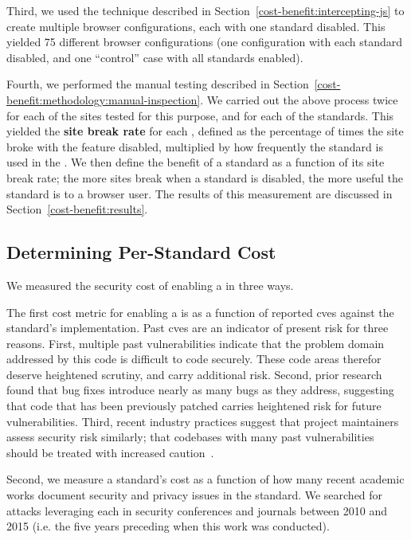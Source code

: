 Third, we used the technique described in
Section~\ref{cost-benefit:intercepting-js} to create multiple browser
configurations, each with one standard disabled.  This yielded 75 different
browser configurations (one configuration with each standard disabled, and one
``control'' case with all standards enabled).

Fourth, we performed the manual testing described in
Section~\ref{cost-benefit:methodology:manual-inspection}.  We carried out the
above process twice for each of the \NumSitesTestedInStandardTests sites tested
for this purpose, and for each of the \NumStandards \WAPI standards.
This yielded the \textbf{site break rate} for each \WAS, defined as the
percentage of times the site broke with the feature disabled, multiplied by
how frequently the standard is used in the \ATK.  We then define the benefit of
a standard as a function of its site break rate; the more sites break when a
standard is disabled, the more useful the standard is to a browser user.  The
results of this measurement are discussed in
Section~\ref{cost-benefit:results}.


\subsection{Determining Per-Standard Cost}
\label{cost-benefit:methodology:per-standard-cost}
We measured the security cost of enabling a \WAS in three ways.

The first cost metric for enabling a \WAS is as a function of reported
\gls{cve}s against the standard's implementation.  Past \gls{cve}s are an
indicator of present risk for three reasons.  First, multiple past
vulnerabilities indicate that the problem domain addressed by this code is
difficult to code securely. These code areas therefor deserve heightened
scrutiny, and carry additional risk.  Second, prior
research~\cite{ozment2006milk,zimmermann2008predicting} found that bug fixes
introduce nearly as many bugs as they address, suggesting that code that has
been previously patched carries heightened risk for future
vulnerabilities.  Third, recent industry practices suggest that project
maintainers assess security risk similarly; that codebases with many past
vulnerabilities should be treated with increased caution~\cite{boringssl}.

Second, we measure a standard's cost as a function of how many recent
academic works document security and privacy issues in the standard.  We
searched for attacks leveraging each \WAS in security conferences and journals
between 2010 and 2015 (i.e. the five years preceding when this work was
conducted).

